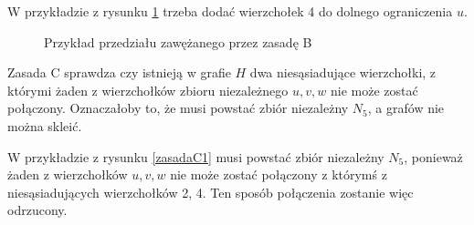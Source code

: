 W przykładzie z rysunku \ref{zasadaB2} trzeba dodać wierzchołek 4 do dolnego ograniczenia $u$.
\begin{figure}[H]
  \centering
 \caption{Przykład przedziału zawężanego przez zasadę B}
 \label{zasadaB2}
 \end{figure}

Zasada C sprawdza czy istnieją w grafie $H$ dwa niesąsiadujące wierzchołki, z którymi żaden z wierzchołków zbioru niezależnego $u, v, w$ nie może zostać połączony. 
Oznaczałoby to, że musi powstać zbiór niezależny $N_5$, a grafów nie można skleić.

W przykładzie z rysunku \ref{zasadaC1} musi powstać zbiór niezależny $N_5$, ponieważ żaden z wierzchołków $u, v, w$ nie może zostać połączony z którymś z niesąsiadujących 
wierzchołków 2, 4. Ten sposób połączenia zostanie więc odrzucony. 

